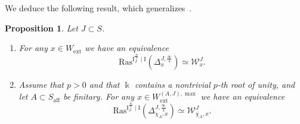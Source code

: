 \documentclass[11pt]{amsart}
\numberwithin{equation}{section}
\theoremstyle{plain}
\newtheorem{prop}[thm]{Proposition}
\theoremstyle{definition}
\newcommand{\I}{{\mathrm I}}
\renewcommand{\k}{\Bbbk}
\newcommand{\sW}{{\mathcal W}}
\newcommand{\X}{{\mathbb X}}
\newcommand{\semi}{{{\frac{\infty}{2}}}}
\newcommand{\quar}{{{\frac{\infty}{4}}}}
\newcommand{\Av}{\mathrm{Av}}
\newcommand{\ex}{\mathrm{ext}}
\newcommand{\af}{\mathrm{aff}}
\newcommand{\Ras}{\mathrm{Ras}}
\begin{document}

We deduce the following result, which generalizes~\cite[Proposition~5.6]{adr}.

\begin{prop}
\label{prop:Ras-D}
Let $J \subset S$.
\begin{enumerate}
\item
\label{it:Ras-D-1}
For any $x \in W_\ex$ we have an equivalence 
\[
\Ras^{\I_J^{\quar}\mid \I} \left( \Delta^{J,\quar}_x \right) \simeq \sW^J_x.
\]
\item
\label{it:Ras-D-2}
Assume that $p>0$ and that $\k$ contains a nontrivial $p$-th root of unity, and let $A \subset S_\af$ be finitary. For any $x \in W_\ex^{(A,J),\max}$ we have an equivalence
\[
\Ras^{\I_J^{\quar}\mid \I} \left( \Delta^{J,\quar}_{\chi_A,x} \right) \simeq \sW^J_{\chi_A,x}. 
\]
\end{enumerate}
\end{prop}
\end{document}
